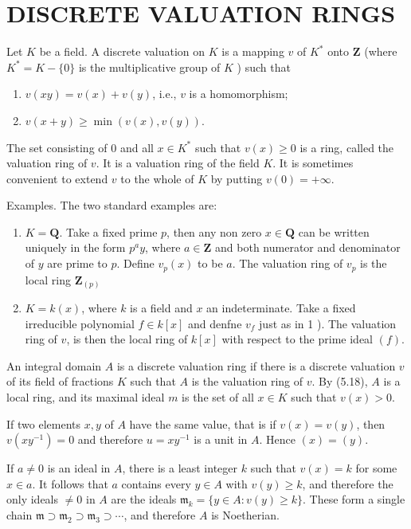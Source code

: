 \documentclass{standalone}
\theoremstyle{definition}
\theoremstyle{remark}
\begin{document}
\section{DISCRETE VALUATION RINGS}
Let $K$ be a field. A discrete valuation on $K$ is a mapping $v$ of $K^{*}$ onto $\mathbf{Z}$ (where $K^{*}=K-\{0\}$ is the multiplicative group of $K$ ) such that

\begin{enumerate}
  \item $v(x y)=v(x)+v(y)$, i.e., $v$ is a homomorphism;

  \item $v(x+y) \geqslant \min (v(x), v(y))$.

\end{enumerate}

The set consisting of 0 and all $x \in K^{*}$ such that $v(x) \geqslant 0$ is a ring, called the valuation ring of $v$. It is a valuation ring of the field $K$. It is sometimes convenient to extend $v$ to the whole of $K$ by putting $v(0)=+\infty$.

Examples. The two standard examples are:

\begin{enumerate}
  \item $K=\mathbf{Q}$. Take a fixed prime $p$, then any non zero $x \in \mathbf{Q}$ can be written uniquely in the form $p^{a} y$, where $a \in \mathbf{Z}$ and both numerator and denominator of $y$ are prime to $p$. Define $v_{p}(x)$ to be $a$. The valuation ring of $v_{p}$ is the local ring $\mathbf{Z}_{(p)}$

  \item $K=k(x)$, where $k$ is a field and $x$ an indeterminate. Take a fixed irreducible polynomial $f \in k[x]$ and denfne $v_{f}$ just as in 1 ). The valuation ring of $v$, is then the local ring of $k[x]$ with respect to the prime ideal $(f)$.

\end{enumerate}

An integral domain $A$ is a discrete valuation ring if there is a discrete valuation $v$ of its field of fractions $K$ such that $A$ is the valuation ring of $v$. By (5.18), $A$ is a local ring, and its maximal ideal $m$ is the set of all $x \in K$ such that $v(x)>0$.

If two elements $x, y$ of $A$ have the same value, that is if $v(x)=v(y)$, then $v\left(x y^{-1}\right)=0$ and therefore $u=x y^{-1}$ is a unit in $A$. Hence $(x)=(y)$.

If $a \neq 0$ is an ideal in $A$, there is a least integer $k$ such that $v(x)=k$ for some $x \in a$. It follows that $a$ contains every $y \in A$ with $v(y) \geqslant k$, and therefore the only ideals $\neq 0$ in $A$ are the ideals $\mathfrak{m}_{k}=\{y \in A: v(y) \geqslant k\}$. These form a single chain $\mathfrak{m} \supset \mathfrak{m}_{2} \supset \mathfrak{m}_{3} \supset \cdots$, and therefore $A$ is Noetherian.
\end{document}
